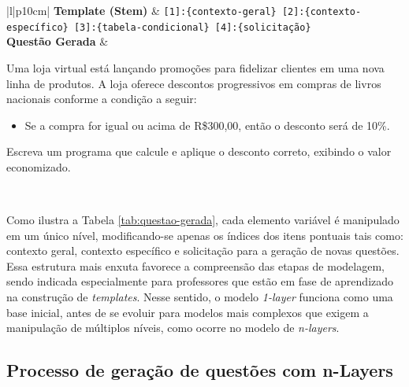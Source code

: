 \begin{table}[htbp]
\centering
\begin{tabular}{|l|p{10cm}|}
\hline
\textbf{Template (Stem)} 
& \texttt{[1]:\{contexto-geral\} [2]:\{contexto-específico\} [3]:\{tabela-condicional\} [4]:\{solicitação\}} \\
\hline
\textbf{Questão Gerada} 
& 
\begin{minipage}[t]{\linewidth}
\vspace{0.5em}
Uma loja virtual está lançando promoções para fidelizar clientes em uma nova linha de produtos.  
A loja oferece descontos progressivos em compras de livros nacionais conforme a condição a seguir:  
\begin{itemize}[leftmargin=1em]
    \item Se a compra for igual ou acima de R\$300,00, então o desconto será de 10\%.
\end{itemize}
Escreva um programa que calcule e aplique o desconto correto, exibindo o valor economizado. 
\vspace{0.5em}
\end{minipage} \\
\hline
\end{tabular}
\caption{Questão gerada (Autoria Própria, 2024)}
\label{tab:questao-gerada}
\end{table}



Como ilustra a Tabela \ref{tab:questao-gerada}, cada elemento variável é manipulado em um único nível, modificando-se apenas os índices dos itens pontuais tais como: contexto geral, contexto específico e solicitação para a geração de novas questões. Essa estrutura mais enxuta favorece a compreensão das etapas de modelagem, sendo indicada especialmente para professores que estão em fase de aprendizado na construção de \textit{templates}. Nesse sentido, o modelo \textit{1-layer} funciona como uma base inicial, antes de se evoluir para modelos mais complexos que exigem a manipulação de múltiplos níveis, como ocorre no modelo de \textit{n-layers}.

\subsection{Processo de geração de questões com  n-Layers}

